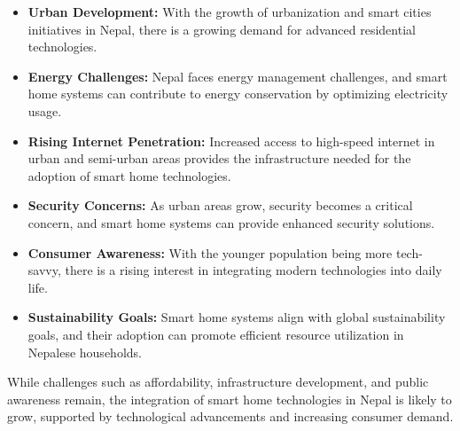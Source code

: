 \begin{itemize}
	\item \textbf{Urban Development:} With the growth of urbanization and smart cities initiatives in Nepal, there is a growing demand for advanced residential technologies.
	\item \textbf{Energy Challenges:} Nepal faces energy management challenges, and smart home systems can contribute to energy conservation by optimizing electricity usage.
	\item \textbf{Rising Internet Penetration:} Increased access to high-speed internet in urban and semi-urban areas provides the infrastructure needed for the adoption of smart home technologies.
	\item \textbf{Security Concerns:} As urban areas grow, security becomes a critical concern, and smart home systems can provide enhanced security solutions.
	\item \textbf{Consumer Awareness:} With the younger population being more tech-savvy, there is a rising interest in integrating modern technologies into daily life.
	\item \textbf{Sustainability Goals:} Smart home systems align with global sustainability goals, and their adoption can promote efficient resource utilization in Nepalese households.
\end{itemize}

While challenges such as affordability, infrastructure development, and public awareness remain, the integration of smart home technologies in Nepal is likely to grow, supported by technological advancements and increasing consumer demand.


